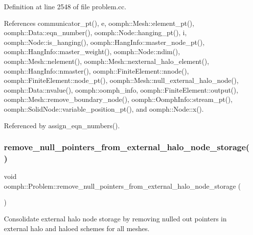 Definition at line 2548 of file problem.\+cc.



References communicator\+\_\+pt(), e, oomph\+::\+Mesh\+::element\+\_\+pt(), oomph\+::\+Data\+::eqn\+\_\+number(), oomph\+::\+Node\+::hanging\+\_\+pt(), i, oomph\+::\+Node\+::is\+\_\+hanging(), oomph\+::\+Hang\+Info\+::master\+\_\+node\+\_\+pt(), oomph\+::\+Hang\+Info\+::master\+\_\+weight(), oomph\+::\+Node\+::ndim(), oomph\+::\+Mesh\+::nelement(), oomph\+::\+Mesh\+::nexternal\+\_\+halo\+\_\+element(), oomph\+::\+Hang\+Info\+::nmaster(), oomph\+::\+Finite\+Element\+::nnode(), oomph\+::\+Finite\+Element\+::node\+\_\+pt(), oomph\+::\+Mesh\+::null\+\_\+external\+\_\+halo\+\_\+node(), oomph\+::\+Data\+::nvalue(), oomph\+::oomph\+\_\+info, oomph\+::\+Finite\+Element\+::output(), oomph\+::\+Mesh\+::remove\+\_\+boundary\+\_\+node(), oomph\+::\+Oomph\+Info\+::stream\+\_\+pt(), oomph\+::\+Solid\+Node\+::variable\+\_\+position\+\_\+pt(), and oomph\+::\+Node\+::x().



Referenced by assign\+\_\+eqn\+\_\+numbers().

\mbox{\label{classoomph_1_1Problem_aee39a957d45bc474c1f5b27d96c9dcc0}} 
\subsubsection{\texorpdfstring{remove\+\_\+null\+\_\+pointers\+\_\+from\+\_\+external\+\_\+halo\+\_\+node\+\_\+storage()}{remove\_null\_pointers\_from\_external\_halo\_node\_storage()}}
{\footnotesize\ttfamily void oomph\+::\+Problem\+::remove\+\_\+null\+\_\+pointers\+\_\+from\+\_\+external\+\_\+halo\+\_\+node\+\_\+storage (\begin{DoxyParamCaption}{ }\end{DoxyParamCaption})\hspace{0.3cm}{\ttfamily [private]}}



Consolidate external halo node storage by removing nulled out pointers in external halo and haloed schemes for all meshes. 

